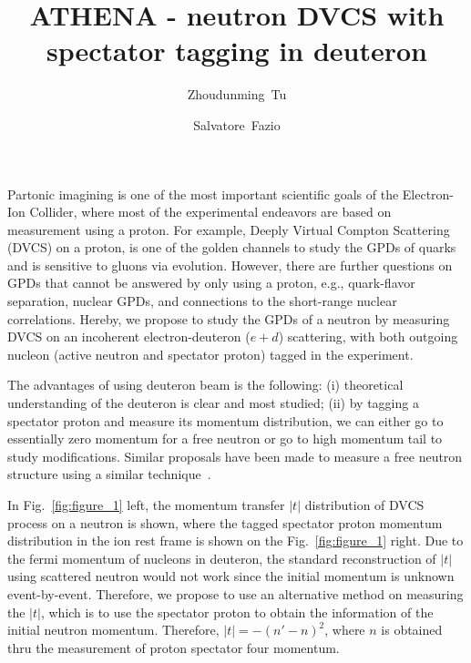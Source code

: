 \documentclass[%
superscriptaddress,
nofootinbib,
 amsmath,amssymb,
 aps,
showkeys
]{revtex4-2}
\begin{document}
\title{ATHENA - neutron DVCS with spectator tagging in deuteron}

\author{Zhoudunming~Tu}

\author{Salvatore~Fazio}

\maketitle

Partonic imagining is one of the most important scientific goals of the Electron-Ion Collider, where most of the experimental endeavors are based on measurement using a proton. For example, Deeply Virtual Compton Scattering (DVCS) on a proton, is one of the golden channels to study the GPDs of quarks and is sensitive to gluons via evolution. However, there are further questions on GPDs that cannot be answered by only using a proton, e.g., quark-flavor separation, nuclear GPDs, and connections to the short-range nuclear correlations. Hereby, we propose to study the GPDs of a neutron by measuring DVCS on an incoherent electron-deuteron ($e+d$) scattering, with both outgoing nucleon (active neutron and spectator proton) tagged in the experiment. 

The advantages of using deuteron beam is the following: (i) theoretical understanding of the deuteron is clear and most studied; (ii) by tagging a spectator proton and measure its momentum distribution, we can either go to essentially zero momentum for a free neutron or go to high momentum tail to study modifications. Similar proposals have been made to measure a free neutron structure using a similar technique~\cite{Jentsch:2021qdp}.

In Fig.~\ref{fig:figure_1} left, the momentum transfer $|t|$ distribution of DVCS process on a neutron is shown, where the tagged spectator proton momentum distribution in the ion rest frame is shown on the Fig.~\ref{fig:figure_1} right. Due to the fermi momentum of nucleons in deuteron, the standard reconstruction of $|t|$ using scattered neutron would not work since the initial momentum is unknown event-by-event. Therefore, we propose to use an alternative method on measuring the $|t|$, which is to use the spectator proton to obtain the information of the initial neutron momentum. Therefore, $|t| = - (n'-n)^{2}$, where $n$ is obtained thru the measurement of proton spectator four momentum. 
\end{document}
